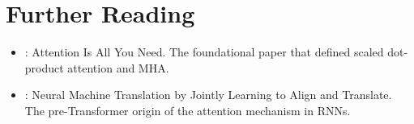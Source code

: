 \section{Further Reading}
\label{ch:09:sec:further}

\begin{itemize}
  \item \textcite{vaswani2017}: Attention Is All You Need. The foundational paper that defined scaled dot-product attention and MHA.
  \item \textcite{bahdanau2014}: Neural Machine Translation by Jointly Learning to Align and Translate. The pre-Transformer origin of the attention mechanism in RNNs.
\end{itemize}

